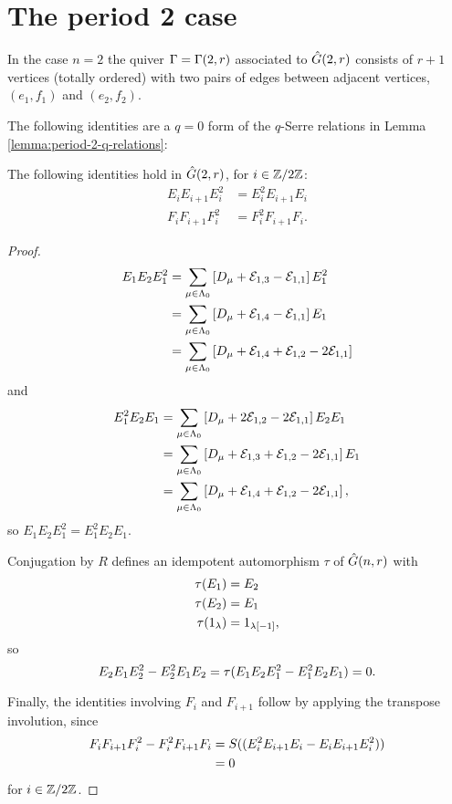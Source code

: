 \documentclass[a4paper, 11pt, twoside]{report}
\begin{document}
\section{The period 2 case}

In the case $n=2$ the quiver $\Gamma=\presentationquiver[2,r]$ associated to $\generic[2,r]$ consists of $r+1$ vertices (totally ordered) with two pairs of edges between adjacent vertices, $(e_1,f_1)$ and $(e_2,f_2)$.

The following identities are a $q=0$ form of the $q$-Serre relations in Lemma \ref{lemma:period-2-q-relations}:

\begin{lemma}\label{lemma:period-2-0-relations}
The following identities hold in $\generic[2,r]$, for $i\in\modn[2]$:
\begin{align*}
E_iE_{i+1}E_i^2 &= E_i^2E_{i+1}E_i\\
F_iF_{i+1}F_i^2 &= F_i^2F_{i+1}F_i.
\end{align*}
\end{lemma}

\begin{proof}
\begin{align*}
E_1E_2E_1^2 &= \sum_{\mu\in\compositions} \left[\diag{\mu}+\elem{1}{3}-\elem{1}{1}\right]E_1^2\\
&= \sum_{\mu\in\compositions} \left[\diag{\mu}+\elem{1}{4}-\elem{1}{1}\right]E_1\\
&= \sum_{\mu\in\compositions} \left[\diag{\mu}+\elem{1}{4}+\elem{1}{2}-2\elem{1}{1}\right]
\end{align*}
and
\begin{align*}
E_1^2E_2E_1 &= \sum_{\mu\in\compositions} \left[\diag{\mu}+2\elem{1}{2}-2\elem{1}{1}\right]E_2E_1\\
&= \sum_{\mu\in\compositions} \left[\diag{\mu}+\elem{1}{3}+\elem{1}{2}-2\elem{1}{1}\right]E_1\\
&= \sum_{\mu\in\compositions} \left[\diag{\mu}+\elem{1}{4}+\elem{1}{2}-2\elem{1}{1}\right],
\end{align*}
so $E_1E_2E_1^2 = E_1^2E_2E_1$.

Conjugation by $R$ defines an idempotent automorphism $\tau$ of $\generic$ with
\begin{align*}
\rotation{E_1} &= E_2\\
\rotation{E_2} &= E_1\\
\rotation{1_\lambda} &= 1_{\lambda[-1]},
\end{align*}
so
\begin{equation*}
E_2E_1E_2^2 - E_2^2E_1E_2 = \rotation{E_1E_2E_1^2-E_1^2E_2E_1} = 0.
\end{equation*}

Finally, the identities involving $F_i$ and $F_{i+1}$ follow by applying the transpose involution, since
\begin{align*}
F_iF_{i+1}F_i^2 - F_i^2F_{i+1}F_i
&= \antipode{(E_i^2E_{i+1}E_i-E_iE_{i+1}E_i^2)}\\
&= 0
\end{align*}
for $i\in\modn[2]$.
\end{proof}
\end{document}
